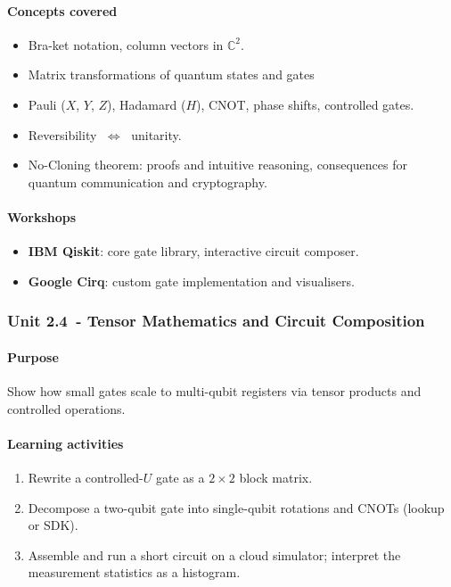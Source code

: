 \paragraph{Concepts covered}
\begin{itemize}
	\item Bra-ket notation, column vectors in $\mathbb{C}^{2}$.  
	\item Matrix transformations of quantum states and gates
	\item Pauli ($X$, $Y$, $Z$), Hadamard ($H$), CNOT, phase shifts, controlled gates.  
	\item Reversibility $\; \Longleftrightarrow \;$ unitarity.  
	\item No-Cloning theorem: proofs and intuitive reasoning, consequences for quantum communication and cryptography.
\end{itemize}

\paragraph{Workshops}
\begin{itemize}
	\item \textbf{IBM Qiskit}: core gate library, interactive circuit composer.  
	\item \textbf{Google Cirq}: custom gate implementation and visualisers.
\end{itemize}

\vspace{0.5em}


\subsubsection*{Unit 2.4 - Tensor Mathematics and Circuit Composition}

\paragraph{Purpose}  
Show how small gates scale to multi-qubit registers via tensor products and controlled operations.

\paragraph{Learning activities}
\begin{enumerate}[label=2.4-\arabic*]
	\item Rewrite a controlled-$U$ gate as a $2\times2$ block matrix.  
	\item Decompose a two-qubit gate into single-qubit rotations and CNOTs (lookup or SDK).  
	\item Assemble and run a short circuit on a cloud simulator; interpret the measurement statistics as a histogram.
\end{enumerate}

